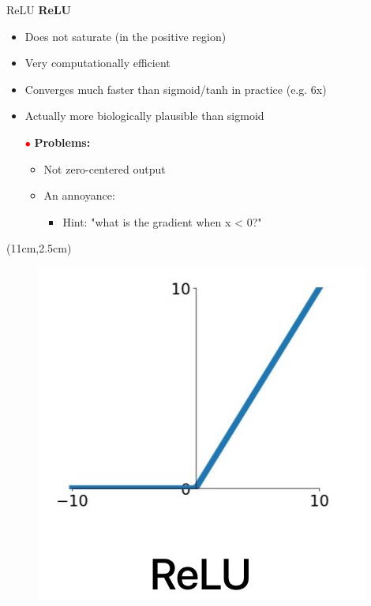 \documentclass[serif, aspectratio=169]{beamer}
\begin{document}
\begin{frame}{ReLU}
	\textbf{ReLU}
	\begin{itemize}
		\item Does not saturate (in the positive region)
		\item Very computationally efficient
		\item Converges much faster than sigmoid/tanh \newline in practice (e.g. 6x)
		\item Actually more biologically plausible than sigmoid
		\item[\textcolor{red}{$\bullet$}] \color{red} \textbf{Problems:}
		\begin{itemize}
			\item \color{red} Not zero-centered output
			\item \color{red} An annoyance:
			\begin{itemize}
				\item \color{red} Hint: "what is the gradient when x < 0?"
			\end{itemize}
		\end{itemize}
	\end{itemize}
	\begin{textblock*}{5cm}(11cm,2.5cm) %
		\begin{figure}[htbp]
			\begin{center}
				\includegraphics[keepaspectratio, scale=0.3]{pic/ReLU}
			\end{center}
		\end{figure}
	\end{textblock*}
\end{frame}
\end{document}
